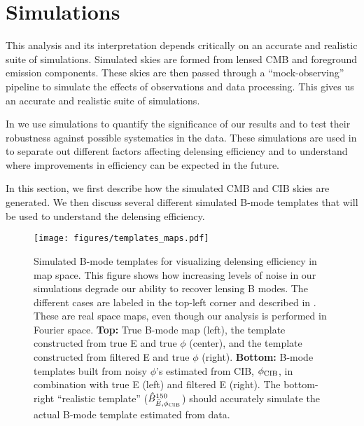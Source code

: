 \section{Simulations}
\label{sec:sim}

This analysis and its interpretation depends critically on an accurate and realistic suite of simulations.
Simulated skies are formed from lensed CMB and foreground emission components.
These skies are then passed through a ``mock-observing'' pipeline to simulate the effects of \sptpol observations and data processing.
This gives us an accurate and realistic suite of simulations.

In  we use simulations to quantify the significance of our results and to test their robustness against possible systematics in the data.
These simulations are used in  to separate out different factors affecting delensing efficiency and to understand where improvements in efficiency can be expected in the future.

In this section, we first describe how the simulated CMB and CIB skies are generated.
We then discuss several different simulated B-mode templates that will be used to understand the delensing efficiency.

\begin{figure*}
\begin{center}
\texttt{[image: figures/templates\_maps.pdf]}
\caption{Simulated B-mode templates for visualizing delensing efficiency in map space.
  This figure shows how increasing levels of noise in our simulations degrade our ability to recover lensing B modes.
  The different cases are labeled in the top-left corner and described in .
  These are real space maps, even though our analysis is performed in Fourier space.
  \textbf{Top:} True B-mode map (left), the template constructed from true E and true $\phi$ (center), and the template constructed from filtered E and true $\phi$ (right).
  \textbf{Bottom:} B-mode templates built from noisy $\phi$'s estimated from CIB, $\phi_{\rm CIB}$, in combination with true E (left) and filtered E (right).
  The bottom-right ``realistic template'' ($\hat{B}^{150}_{\bar{E},\phi_{\rm CIB}}$) should accurately simulate the actual B-mode template estimated from data.
}
\label{fig:templ-maps}
\end{center}
\end{figure*}

